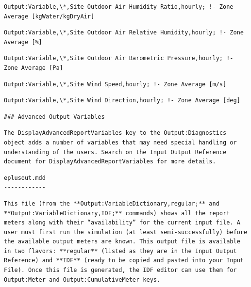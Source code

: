 \begin{lstlisting}
Output:Variable,\*,Site Outdoor Air Humidity Ratio,hourly; !- Zone Average [kgWater/kgDryAir]
\end{lstlisting}

\begin{lstlisting}
Output:Variable,\*,Site Outdoor Air Relative Humidity,hourly; !- Zone Average [%]
\end{lstlisting}

\begin{lstlisting}
Output:Variable,\*,Site Outdoor Air Barometric Pressure,hourly; !- Zone Average [Pa]
\end{lstlisting}

\begin{lstlisting}
Output:Variable,\*,Site Wind Speed,hourly; !- Zone Average [m/s]
\end{lstlisting}

\begin{lstlisting}
Output:Variable,\*,Site Wind Direction,hourly; !- Zone Average [deg]
\end{lstlisting}

\begin{lstlisting}
### Advanced Output Variables
\end{lstlisting}

\begin{lstlisting}
The DisplayAdvancedReportVariables key to the Output:Diagnostics object adds a number of variables that may need special handling or understanding of the users. Search on the Input Output Reference document for DisplayAdvancedReportVariables for more details.
\end{lstlisting}

\begin{lstlisting}
eplusout.mdd
------------
\end{lstlisting}

\begin{lstlisting}
This file (from the **Output:VariableDictionary,regular;** and **Output:VariableDictionary,IDF;** commands) shows all the report meters along with their “availability” for the current input file. A user must first run the simulation (at least semi-successfully) before the available output meters are known. This output file is available in two flavors: **regular** (listed as they are in the Input Output Reference) and **IDF** (ready to be copied and pasted into your Input File). Once this file is generated, the IDF editor can use them for Output:Meter and Output:CumulativeMeter keys.
\end{lstlisting}

